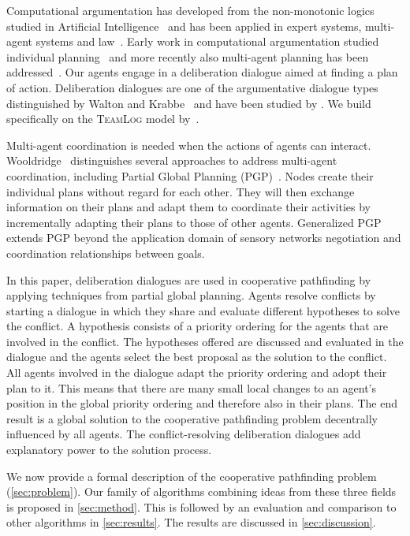 Computational argumentation has developed from the non-monotonic logics studied 
in Artificial Intelligence~\cite{dung1995} and has been applied in expert 
systems, multi-agent systems and law~\cite{vanEemerenEtal2014ch11}. Early work in 
computational argumentation studied individual planning~\cite{pollock1995} and 
more recently also multi-agent planning has been 
addressed~\cite{ferrando2012,pardo2011}. Our agents engage in a deliberation 
dialogue aimed at finding a plan of action. Deliberation dialogues are one of 
the argumentative dialogue types distinguished by Walton and 
Krabbe~\cite{walton1995} and have been studied by 
\cite{mcburney2007,walton2014}. We build specifically on the \textsc{TeamLog} 
model by~\cite{dunin-keplicz2011}.

Multi-agent coordination is needed when the actions of agents can interact.
Wooldridge~\cite[pp.~202--204]{wooldridge2009} distinguishes several 
approaches to address multi-agent coordination, including Partial Global 
Planning (PGP)~\cite{durfee1991}. Nodes create their individual plans without 
regard for each other. They will then exchange information on their plans and
adapt them to coordinate their activities by incrementally 
adapting their plans to those of other agents.
Generalized PGP \cite{decker1992} extends PGP beyond the application domain of sensory networks %
negotiation and coordination relationships between goals. 

In this paper, deliberation dialogues are used in cooperative pathfinding by applying techniques from
partial global planning. Agents resolve conflicts by starting a dialogue in
which they share and evaluate different hypotheses to solve the conflict. A
hypothesis consists of a priority ordering for the agents that are involved in
the conflict. The hypotheses offered are discussed and evaluated in the
dialogue and the agents select the best proposal as the solution
to the conflict. All agents involved in the dialogue adapt the priority
ordering and adopt their plan to it. This means that there are many small local
changes to an agent's position in the global priority ordering and therefore also in
their plans. The end result is a global solution to the cooperative pathfinding
problem decentrally influenced by all agents. The conflict-resolving deliberation dialogues add explanatory power to the solution process.

We now provide a formal description of the cooperative pathfinding problem 
(\autoref{sec:problem}). Our family 
of algorithms combining ideas from these three fields is proposed in 
\autoref{sec:method}. This is followed by an evaluation and comparison to other 
algorithms in \autoref{sec:results}. The results are discussed in 
\autoref{sec:discussion}.
